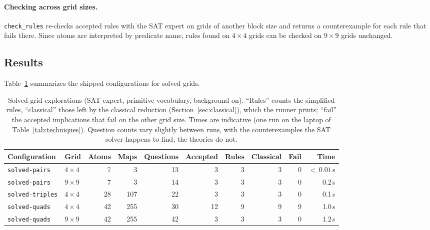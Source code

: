 \documentclass[11pt,a4paper]{article}
\theoremstyle{definition}
\theoremstyle{remark}
\newcommand{\code}[1]{\texttt{#1}}
\begin{document}
\paragraph{Checking across grid sizes.}
\code{check\_rules} re-checks accepted rules with the SAT expert on grids of another block size and returns a counterexample for each rule that fails there. Since atoms are interpreted by predicate name, rules found on $4 \times 4$ grids can be checked on $9 \times 9$ grids unchanged.

\subsection{Results}\label{sec:solved-results}

Table~\ref{tab:solved} summarizes the shipped configurations for solved grids.

\begin{table}[t]
\centering\small
\begin{tabular}{@{}llrrrrrrrr@{}}
\toprule
Configuration & Grid & Atoms & Maps & Questions & Accepted & Rules & Classical & Fail & Time \\
\midrule
\code{solved-pairs} & $4\times4$ & 7 & 3 & 13 & 3 & 3 & 3 & 0 & ${<}\,0.01$\,s \\
\code{solved-pairs} & $9\times9$ & 7 & 3 & 14 & 3 & 3 & 3 & 0 & 0.2\,s \\
\code{solved-triples} & $4\times4$ & 28 & 107 & 22 & 3 & 3 & 3 & 0 & 0.1\,s \\
\code{solved-quads} & $4\times4$ & 42 & 255 & 30 & 12 & 9 & 9 & 9 & 1.0\,s \\
\code{solved-quads} & $9\times9$ & 42 & 255 & 42 & 3 & 3 & 3 & 0 & 1.2\,s \\
\bottomrule
\end{tabular}
\caption{Solved-grid explorations (SAT expert, primitive vocabulary, background on). ``Rules'' counts the simplified rules, ``classical'' those left by the classical reduction (Section~\ref{sec:classical}), which the runner prints; ``fail'' the accepted implications that fail on the other grid size. Times are indicative (one run on the laptop of Table~\ref{tab:techniques}). Question counts vary slightly between runs, with the counterexamples the SAT solver happens to find; the theories do not.}
\label{tab:solved}
\end{table}
\end{document}

